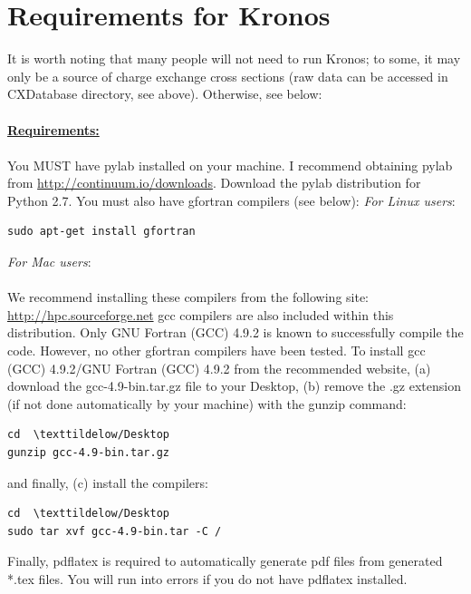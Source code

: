 \documentclass[twocolumn, prb, amsmath,amssymb,amsfonts]{revtex4}
\begin{document}
\section{Requirements for Kronos}
It is worth noting that many people will not need to run Kronos; to some, it may only be a source of charge exchange cross sections (raw data can be accessed in CXDatabase directory, see above).  Otherwise, see below:\\ \\
\noindent
\underline{\textbf{Requirements:}}\\
\\
You MUST have pylab installed on your machine.  I recommend obtaining pylab from \url{http://continuum.io/downloads}.  Download the pylab distribution for Python 2.7. You must also have gfortran compilers (see below):  
\newpage
\noindent
\textit{For Linux users}:
\begin{verbatim}
sudo apt-get install gfortran
\end{verbatim}
\textit{For Mac users}:
\\
\\We recommend installing these compilers from the following site:  \url{http://hpc.sourceforge.net}  gcc compilers are also included within this distribution.  Only GNU Fortran (GCC) 4.9.2 is known to successfully compile the code.  However, no other gfortran compilers have been tested. To install gcc (GCC) 4.9.2/GNU Fortran (GCC) 4.9.2 from the recommended website, (a) download the gcc-4.9-bin.tar.gz file to your Desktop, (b) remove the .gz extension (if not done automatically by your machine) with the gunzip command:
\begin{Verbatim}[commandchars=\\\{\}]
cd  \texttildelow/Desktop
gunzip gcc-4.9-bin.tar.gz
\end{Verbatim}
and finally, (c) install the compilers:
\begin{Verbatim}[commandchars=\\\{\}]
cd  \texttildelow/Desktop
sudo tar xvf gcc-4.9-bin.tar -C /
\end{Verbatim}
\noindent
Finally, pdflatex is required to automatically generate pdf files from generated *.tex files.  You will run into errors if you do not have pdflatex installed.  
\end{document}
